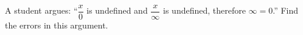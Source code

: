 A student argues: ``$\dfrac{x}{0}$ is undefined and $\dfrac{x}{\infty}$ is undefined, therefore $\infty=0$.'' Find the errors in this argument.
